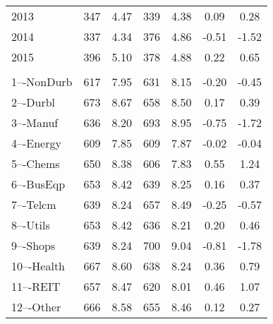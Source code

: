 \begin{tabular}{lcccccc}
	2013 & 347  &   4.47  &    339  &   4.38  &   0.09  &      0.28 \\ 
	2014 & 337  &   4.34  &    376  &   4.86  &  -0.51  &     -1.52 \\ 
	2015 & 396  &   5.10  &    378  &   4.88  &   0.22  &      0.65 \\ 
	\addlinespace \multicolumn{7}{l}{{Industry (FF 12)}} \\ 
	1–-NonDurb     &    617   &    7.95   &     631   &    8.15   &   -0.20   &    -0.45   \\ 
	2–-Durbl       &    673   &    8.67   &     658   &    8.50   &    0.17   &     0.39   \\ 
	3–-Manuf       &    636   &    8.20   &     693   &    8.95   &   -0.75   &    -1.72   \\ 
	4–-Energy      &    609   &    7.85   &     609   &    7.87   &   -0.02   &    -0.04   \\ 
	5–-Chems       &    650   &    8.38   &     606   &    7.83   &    0.55   &     1.24   \\ 
	6–-BusEqp      &    653   &    8.42   &     639   &    8.25   &    0.16   &     0.37   \\ 
	7–-Telcm       &    639   &    8.24   &     657   &    8.49   &   -0.25   &    -0.57   \\ 
	8–-Utils       &    653   &    8.42   &     636   &    8.21   &    0.20   &     0.46   \\ 
	9–-Shops       &    639   &    8.24   &     700   &    9.04   &   -0.81   &    -1.78   \\ 
	10–-Health      &    667   &    8.60   &     638   &    8.24   &    0.36   &     0.79   \\ 
	11–-REIT        &    657   &    8.47   &     620   &    8.01   &    0.46   &     1.07   \\ 
	12–-Other       &    666   &    8.58   &     655   &    8.46   &    0.12   &     0.27   \\ 
	\bottomrule
\end{tabular}
